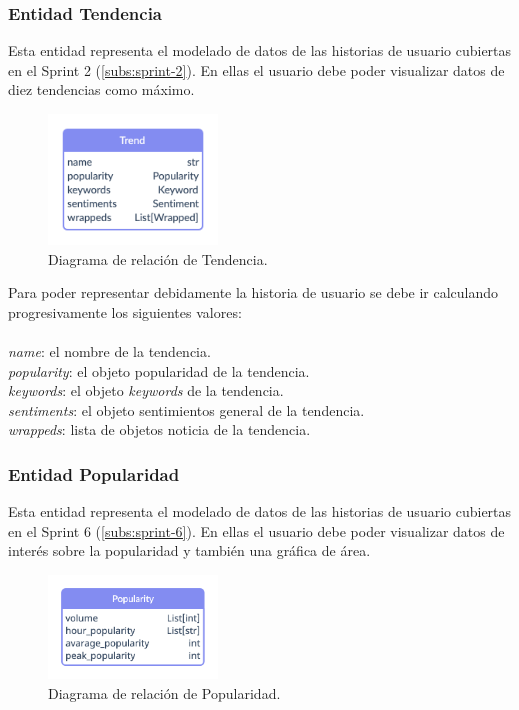 \subsubsection{Entidad Tendencia}\label{subsub:ent-tendencia}
Esta entidad representa el modelado de datos de las historias de usuario cubiertas en el Sprint 2 (\ref{subs:sprint-2}). En ellas el usuario debe poder visualizar datos de diez tendencias como máximo.
\begin{figure}[H]
    \centering
    \myfloatalign
    \includegraphics[width=0.4\textwidth]{gfx/diagrama-er0.png}
    \caption[Diagrama de relación de Tendencia]{Diagrama de relación de Tendencia.}\label{gfx:diagrama-er0}
\end{figure}
Para poder representar debidamente la historia de usuario se debe ir calculando progresivamente los siguientes valores:
\\\\
\textit{name}: el nombre de la tendencia.  \\
\textit{popularity}: el objeto popularidad de la tendencia.    \\
\textit{keywords}: el objeto \textit{keywords} de la tendencia.    \\
\textit{sentiments}: el objeto sentimientos general de la tendencia.    \\
\textit{wrappeds}: lista de objetos noticia de la tendencia.

\subsubsection{Entidad Popularidad}\label{subsub:ent-popularidad}
Esta entidad representa el modelado de datos de las historias de usuario cubiertas en el Sprint 6 (\ref{subs:sprint-6}). En ellas el usuario debe poder visualizar datos de interés sobre la popularidad y también una gráfica de área.
\begin{figure}[H]
    \centering
    \myfloatalign
    \includegraphics[width=0.4\textwidth]{gfx/diagrama-er1.png}
    \caption[Diagrama de relación de Popularidad]{Diagrama de relación de Popularidad.}\label{gfx:diagrama-er1}
\end{figure}

